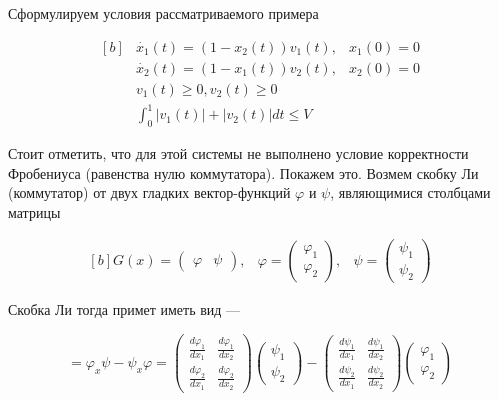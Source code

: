 \documentclass[a4paper,12pt]{article}
\begin{document}
Сформулируем условия рассматриваемого примера

\begin{equation*}
  \begin{aligned}[b]
    &\dot{x_1}(t) = (1 -x_2(t))v_1(t), & x_1(0)=0\\
    &\dot{x_2}(t) = (1-x_1(t))v_2(t), & x_2(0) = 0\\[8pt]
    &v_1(t) \ge 0, v_2(t) \ge 0 \\
    &\int_{0}^{1} |v_1(t)| + |v_2(t)| dt \le V
  \end{aligned}
\end{equation*}


Стоит отметить, что для этой системы не выполнено условие корректности
Фробениуса (равенства нулю коммутатора). Покажем это. Возмем скобку
Ли (коммутатор) от двух гладких вектор-функций $\varphi$ и $\psi$,
являющимися столбцами матрицы

\begin{equation*}
  \begin{aligned}[b]
    G(x) = 
    \begin{pmatrix}
      \varphi & \psi
    \end{pmatrix},
    &
    \varphi =
    \begin{pmatrix}
      \varphi_1\\ \varphi_2
    \end{pmatrix},
    &
    \psi =
    \begin{pmatrix}
      \psi_1 \\ \psi_2
    \end{pmatrix}
  \end{aligned}
\end{equation*}


Скобка Ли тогда примет иметь вид ---

\begin{equation*}
  [\varphi,\psi] = \varphi_x \psi - \psi_x \varphi = 
  \begin{pmatrix}
    \frac{d \varphi_1}{d x_1} & \frac{d \varphi_1}{d x_2} \\
    \frac{d \varphi_2}{d x_1} & \frac{d \varphi_2}{d x_2}
  \end{pmatrix}
  \begin{pmatrix}
    \psi_1 \\ \psi_2
  \end{pmatrix}
  -
  \begin{pmatrix}
    \frac{d \psi_1}{d x_1} & \frac{d \psi_1}{d x_2} \\
    \frac{d \psi_2}{d x_1} & \frac{d \psi_2}{d x_2}
  \end{pmatrix}
  \begin{pmatrix}
    \varphi_1 \\ \varphi_2
  \end{pmatrix}
\end{equation*}
\end{document}
